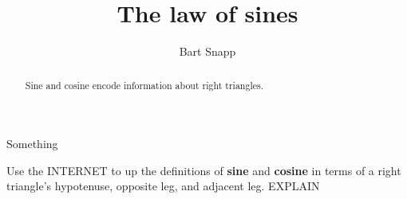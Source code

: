 \documentclass[noauthor,nooutcomes,12pt]{ximera}
\title{The law of sines}
\author{Bart Snapp}
\begin{document}
\begin{abstract}
  Sine and cosine encode information about right triangles.
\end{abstract}
\maketitle

\begin{listOutcomes}
\item Something
\end{listOutcomes}
\mynewpage




\begin{question}
  Use the INTERNET to up the definitions of \textbf{sine} and
  \textbf{cosine} in terms of a right triangle's hypotenuse, opposite
  leg, and adjacent leg. EXPLAIN
  
  
\end{question}
\mynewpage
\end{document}
